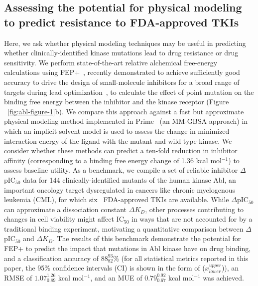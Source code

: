\documentclass[phd,tocprelim]{cornell}
\renewcommand{\FIG}[1]{\autoref{fig:#1}}
\begin{document}
  

\subsection{Assessing the potential for physical modeling to predict resistance to FDA-approved TKIs}
  Here, we ask whether physical modeling techniques may be useful in predicting whether clinically-identified kinase mutations lead to drug resistance or drug sensitivity.
   We perform state-of-the-art relative alchemical free-energy calculations using FEP+~\citep{Wang:J.Am.Chem.Soc.:2015}, recently demonstrated to achieve sufficiently good accuracy to drive the design of small-molecule inhibitors for a broad range of targets during lead optimization~\citep{Lovering:ChemMedChem:2016,Chodera:Curr.Opin.Struct.Biol.:2011,Wang:J.Am.Chem.Soc.:2015,abel2017accelerating}, to calculate the effect of point mutation on the binding free energy between the inhibitor and the kinase receptor (Figure ~\ref{fig:abl-figure-1}b).
  We compare this approach against a fast but approximate physical modeling method implemented in Prime~\citep{Rapp:J.Chem.Inf.Model.:2011} (an MM-GBSA approach) in which an implicit solvent model is used to assess the change in minimized interaction energy of the ligand with the mutant and wild-type kinase.
  We consider whether these methods can predict a ten-fold reduction in inhibitor affinity (corresponding to a binding free energy change of 1.36 kcal mol$^{-1}$) to assess baseline utility.
  As a benchmark, we compile a set of reliable inhibitor $\Delta$pIC$_{50}$ data for 144 clinically-identified mutants of the human kinase Abl, an important oncology target dysregulated in cancers like chronic myelogenous leukemia (CML), for which six~\citep{fda-approved-kinase-inhibitors} FDA-approved TKIs are available.
  While $\Delta$pIC$_{50}$ can approximate a dissociation constant $\Delta K_{D}$, other processes contributing to changes in cell viability might affect IC$_{50}$ in ways that are not accounted for by a traditional binding experiment, motivating a quantitative comparison between $\Delta$pIC$_{50}$ and $\Delta K_{D}$.
  The results of this benchmark demonstrate the potential for FEP+ to predict the impact that mutations in Abl kinase have on drug binding, and a classification accuracy of $88_{82}^{93}$\%  (for all statistical metrics reported in this paper, the 95\% confidence intervals (CI) is shown in the form of ($x^{upper}_{lower}$)), an RMSE of $1.07_{0.89}^{1.26}$ kcal mol$^{-1}$, and an MUE of $0.79_{0.67}^{0.92}$ kcal mol$^{-1}$ was achieved. 
  
\end{document}
